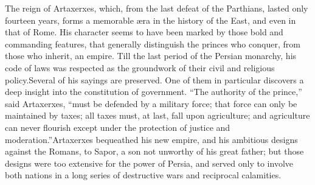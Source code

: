 


The reign of Artaxerxes, which, from the last defeat of the
Parthians, lasted only fourteen years, forms a memorable æra in
the history of the East, and even in that of Rome. His character
seems to have been marked by those bold and commanding features,
that generally distinguish the princes who conquer, from those
who inherit, an empire. Till the last period of the Persian
monarchy, his code of laws was respected as the groundwork of
their civil and religious policy.\footnotemark[54] Several of his sayings are
preserved. One of them in particular discovers a deep insight
into the constitution of government. “The authority of the
prince,” said Artaxerxes, “must be defended by a military force;
that force can only be maintained by taxes; all taxes must, at
last, fall upon agriculture; and agriculture can never flourish
except under the protection of justice and moderation.”\footnotemark[55]
Artaxerxes bequeathed his new empire, and his ambitious designs
against the Romans, to Sapor, a son not unworthy of his great
father; but those designs were too extensive for the power of
Persia, and served only to involve both nations in a long series
of destructive wars and reciprocal calamities.



